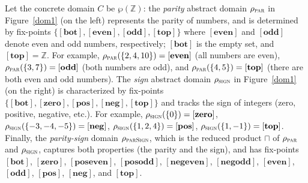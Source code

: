 \documentclass[prodmode,acmtocl]{acmsmall}
\def\uco{\ensuremath{\rho}\xspace}
\newcommand{\0}{\mbox{\bf 0}}
\def\INTEGERS{\mathbb{Z}}
\def\PARDOM{\ensuremath{\uco_{\textsc{par}}}\xspace}
\def\EVEN{\ABSVAL{even}}
\def\ODD{\ABSVAL{odd}}
\def\TOP{\ABSVAL{top}}
\def\BOT{\ABSVAL{bot}}
\def\SIGNDOM{\ensuremath{\uco_{\textsc{sign}}}\xspace}
\def\POS{\ABSVAL{pos}}
\def\NEG{\ABSVAL{neg}}
\def\ZERO{\ABSVAL{zero}}
\def\PARSIGNDOM{\ensuremath{\uco_{\textsc{parSign}}}\xspace}
\def\POSEVEN{\ABSVAL{poseven}}
\def\POSODD{\ABSVAL{posodd}}
\def\NEGEVEN{\ABSVAL{negeven}}
\def\NEGODD{\ABSVAL{negodd}}
\newcommand{\ABSVAL}[1]{\left[\mathbf{#1}\right]}
\begin{document}
\begin{example}
  Let the concrete domain $C$ be $\wp(\INTEGERS)$: the \emph{parity}
  abstract domain $\PARDOM$ in Figure~\ref{dom1} (on the left)
  represents the parity of numbers, and is determined by fix-points $\{
  \BOT, \EVEN, \ODD, \TOP \}$ where $\EVEN$ and $\ODD$ denote even and
  odd numbers, respectively; $\BOT$ is the empty set, and $\TOP =
  \INTEGERS$.  For example, $\PARDOM(\{2,4,10\}) = \EVEN$ (all numbers
  are even), $\PARDOM(\{3,7\}) = \ODD$ (both numbers are odd), and
  $\PARDOM(\{4,5\}) = \TOP$ (there are both even and odd numbers).
  The \emph{sign} abstract domain $\SIGNDOM$ in Figure~\ref{dom1} (on
  the right) is characterized by fix-points $\{ \BOT, \ZERO, \POS,
  \NEG, \TOP \}$ and tracks the sign of integers (zero, positive,
  negative, etc.).  For example, $\SIGNDOM(\{0\}) = \ZERO$,
  $\SIGNDOM(\{-3,-4,-5\}) = \NEG$, $\SIGNDOM(\{1,2,4\}) = \POS$,
  $\SIGNDOM(\{1,-1\}) = \TOP$.  Finally, the \emph{parity-sign} domain
  $\PARSIGNDOM$, which is the reduced product $\sqcap$ of $\PARDOM$
  and $\SIGNDOM$, captures both properties (the parity and the sign),
  and has fix-points $\BOT$, $\ZERO$, $\POSEVEN$, $\POSODD$,
  $\NEGEVEN$, $\NEGODD$, $\EVEN$, $\ODD$, $\POS$, $\NEG$, and $\TOP$.
  \begin{figure}[h]
    \begin{center}
\end{center}
\end{figure}
\end{example}
\end{document}
